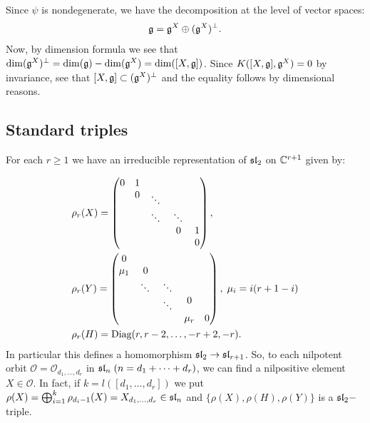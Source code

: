 \begin{dang}
    \begin{remark}
        Since $\psi$ is nondegenerate, we have the decomposition at the level of vector spaces:
        \begin{equation}
            \mathfrak{g}=\mathfrak{g}^X\oplus(\mathfrak{g}^X)^\perp.
        \end{equation}
        Now, by dimension formula we see that $\dim(\mathfrak{g}^X)^\perp=\dim(\mathfrak{g})-\dim(\mathfrak{g}^X)=\dim([X,\mathfrak{g}])$.
        Since $K([X,\mathfrak{g}],\mathfrak{g}^X)=0$ by invariance, see that $[X,\mathfrak{g}]\subset(\mathfrak{g}^X)^\perp$ and the equality
        follows by dimensional reasons.
    \end{remark}
\end{dang}
\subsection{Standard triples}
For each $r\geq1$ we have an irreducible representation of $\mathfrak{sl}_2$ on $\mathbb{C}^{r+1}$ given by:

  \begin{equation}
    \begin{split}
        &\rho_r(X)=\begin{pmatrix}
0&1&&&\\ &0&\rotatebox{-45}{$\cdots$}&&\\ &&\rotatebox{-45}{$\cdots$}&\rotatebox{-45}{$\cdots$}&\\&&&0&1\\&&&&0
\end{pmatrix},\\
        &\rho_r(Y)=\begin{pmatrix}
    0&&&&\\ \mu_1&0&&&\\ &\rotatebox{-45}{$\cdots$}&\rotatebox{-45}{$\cdots$}&&\\ &&\rotatebox{-45}{$\cdots$}&0&\\ &&&\mu_r&0
\end{pmatrix},\;\mu_i=i(r+1-i)\\
        &\rho_r(H)=\text{Diag}(r,r-2,\dots,-r+2,-r).
    \end{split}
  \end{equation}
In particular this defines a homomorphism $\mathfrak{sl}_2\to\mathfrak{sl}_{r+1}$. So, to each nilpotent orbit 
    $\mathcal{O}=\mathcal{O}_{d_1,\dots, d_r}$ in $\mathfrak{sl}_n\;(n=d_1+\cdots+d_r)$, we can find a nilpositive element 
$X\in\mathcal{O}$. In fact, if $k=l([d_1,\dots,d_r])$ we put 
$\rho(X)=\bigoplus_{i=1}^k\rho_{d_i-1}(X)=X_{d_1,\dots, d_r}\in\mathfrak{sl}_n$ and 
$\{\rho(X),\rho(H),\rho(Y)\}$ is a $\mathfrak{sl}_2-$triple.



